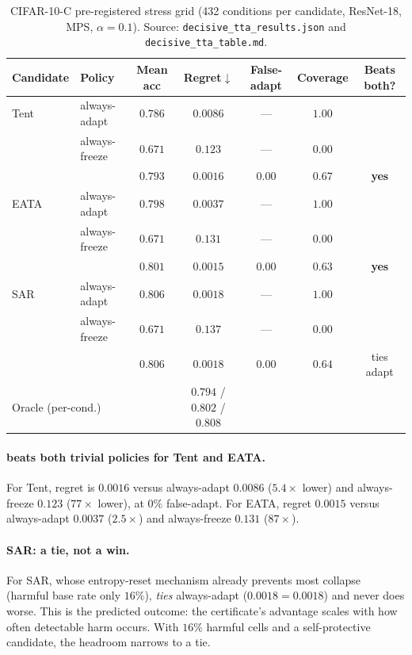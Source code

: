 \begin{table}[ht]
\centering
\small
\caption{CIFAR-10-C pre-registered stress grid (432 conditions per candidate,
ResNet-18, MPS, $\alpha{=}0.1$).  Source: \texttt{decisive\_tta\_results.json}
and \texttt{decisive\_tta\_table.md}.}
\label{tab:exp2-decisive}
\begin{tabular}{llccccc}
\toprule
Candidate & Policy & Mean acc & Regret$\downarrow$ & False-adapt & Coverage & Beats both? \\
\midrule
Tent & always-adapt  & $0.786$ & $0.0086$ & --- & $1.00$ & \\
     & always-freeze & $0.671$ & $0.123$  & --- & $0.00$ & \\
     & \textbf{\KGA{}} & $\mathbf{0.793}$ & $\mathbf{0.0016}$ & $\mathbf{0.00}$ & $0.67$ & \textbf{yes} \\
\midrule
EATA & always-adapt  & $0.798$ & $0.0037$ & --- & $1.00$ & \\
     & always-freeze & $0.671$ & $0.131$  & --- & $0.00$ & \\
     & \textbf{\KGA{}} & $\mathbf{0.801}$ & $\mathbf{0.0015}$ & $\mathbf{0.00}$ & $0.63$ & \textbf{yes} \\
\midrule
SAR  & always-adapt  & $0.806$ & $0.0018$ & --- & $1.00$ & \\
     & always-freeze & $0.671$ & $0.137$  & --- & $0.00$ & \\
     & \KGA{}        & $0.806$ & $0.0018$ & $0.00$ & $0.64$ & ties adapt \\
\midrule
\multicolumn{2}{l}{Oracle (per-cond.)} & & $0.794$ / $0.802$ / $0.808$ & & & \\
\bottomrule
\end{tabular}
\end{table}

\paragraph{\KGA{} beats both trivial policies for Tent and EATA.}
For Tent, \KGA{} regret is $0.0016$ versus always-adapt $0.0086$
($5.4{\times}$ lower) and always-freeze $0.123$ ($77{\times}$ lower), at
$0\%$ false-adapt.  For EATA, regret $0.0015$ versus always-adapt $0.0037$
($2.5{\times}$) and always-freeze $0.131$ ($87{\times}$).

\paragraph{SAR: a tie, not a win.}
For SAR, whose entropy-reset mechanism already prevents most collapse (harmful base rate
only $16\%$), \KGA{} \emph{ties} always-adapt ($0.0018 = 0.0018$) and never does
worse.  This is the predicted outcome: the certificate's advantage scales with how
often detectable harm occurs.  With $16\%$ harmful cells and a self-protective
candidate, the headroom narrows to a tie.

